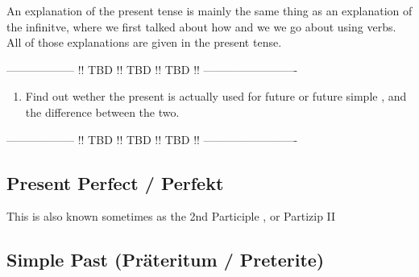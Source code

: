 \documentclass[a4paper,12pt]{article}
\begin{document}
\begin{adjustwidth}{2em}{0pt}

An explanation of the present tense is mainly the same thing as an explanation
of the infinitve, where we first talked about how and we we go about using
verbs. All of those explanations are given in the present tense.\\


\begin{center}
\color{red}
------------------ !! TBD !! TBD !! TBD !! -------------------------

\begin{enumerate}[noitemsep]
	\item Find out wether the present is actually used for future or future
		simple , and the difference between the two. 
\end{enumerate}

------------------ !! TBD !! TBD !! TBD !! -------------------------
\color{black}
\end{center}

\end{adjustwidth}

\subsection{\bf{Present Perfect / Perfekt}}
\begin{adjustwidth}{2em}{0pt}
\label{sec:present_perfect}

This is also known sometimes as the 2nd Participle , or Partizip II 

\end{adjustwidth}

\subsection{\bf{Simple Past (Präteritum / Preterite)}}
\label{sec:simple_past}
\end{document}
